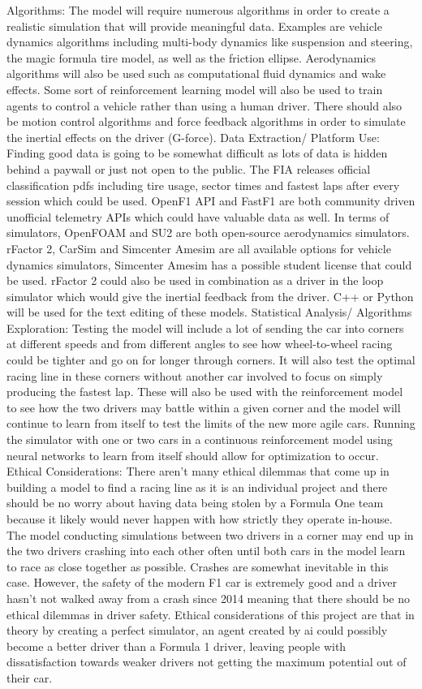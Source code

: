 \documentclass[11pt]{article} %
\begin{document}
Algorithms: The model will require numerous algorithms in order to create a realistic simulation that will provide meaningful data. Examples are vehicle dynamics algorithms including multi-body dynamics like suspension and steering, the magic formula tire model, as well as the friction ellipse. Aerodynamics algorithms will also be used such as computational fluid dynamics and wake effects. Some sort of reinforcement learning model will also be used to train agents to control a vehicle rather than using a human driver. There should also be motion control algorithms and force feedback algorithms in order to simulate the inertial effects on the driver (G-force). 
Data Extraction/ Platform Use: Finding good data is going to be somewhat difficult as lots of data is hidden behind a paywall or just not open to the public. The FIA releases official classification pdfs including tire usage, sector times and fastest laps after every session which could be used. OpenF1 API and FastF1 are both community driven unofficial telemetry APIs which could have valuable data as well. In terms of simulators, OpenFOAM and SU2 are both open-source aerodynamics simulators. rFactor 2, CarSim and Simcenter Amesim are all available options for vehicle dynamics simulators, Simcenter Amesim has a possible student license that could be used. rFactor 2 could also be used in combination as a driver in the loop simulator which would give the inertial feedback from the driver. C++ or Python will be used for the text editing of these models.
Statistical Analysis/ Algorithms Exploration: Testing the model will include a lot of sending the car into corners at different speeds and from different angles to see how wheel-to-wheel racing could be tighter and go on for longer through corners. It will also test the optimal racing line in these corners without another car involved to focus on simply producing the fastest lap. These will also be used with the reinforcement model to see how the two drivers may battle within a given corner and the model will continue to learn from itself to test the limits of the new more agile cars. Running the simulator with one or two cars in a continuous reinforcement model using neural networks to learn from itself should allow for optimization to occur.
Ethical Considerations: There aren’t many ethical dilemmas that come up in building a model to find a racing line as it is an individual project and there should be no worry about having data being stolen by a Formula One team because it likely would never happen with how strictly they operate in-house. The model conducting simulations between two drivers in a corner may end up in the two drivers crashing into each other often until both cars in the model learn to race as close together as possible. Crashes are somewhat inevitable in this case. However, the safety of the modern F1 car is extremely good and a driver hasn’t not walked away from a crash since 2014 meaning that there should be no ethical dilemmas in driver safety.
Ethical considerations of this project are that in theory by creating a perfect simulator, an agent created by ai could possibly become a better driver than a Formula 1 driver, leaving people with dissatisfaction towards weaker drivers not getting the maximum potential out of their car.
\end{document}
